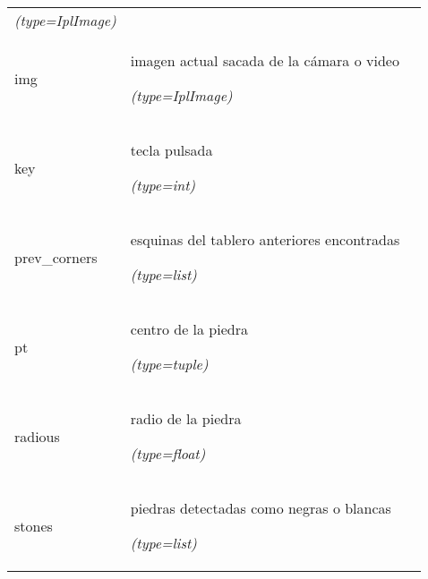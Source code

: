 \begin{longtable}{|p{\varnamewidth}|p{\vardescrwidth}|l}
            {\it (type=IplImage)}&\\
\cline{1-2}
\raggedright i\-m\-g\- & \raggedright imagen actual sacada de la cámara o video

            {\it (type=IplImage)}&\\
\cline{1-2}
\raggedright k\-e\-y\- & \raggedright tecla pulsada

            {\it (type=int)}&\\
\cline{1-2}
\raggedright p\-r\-e\-v\-\_\-c\-o\-r\-n\-e\-r\-s\- & \raggedright esquinas del tablero anteriores encontradas

            {\it (type=list)}&\\
\cline{1-2}
\raggedright p\-t\- & \raggedright centro de la piedra

            {\it (type=tuple)}&\\
\cline{1-2}
\raggedright r\-a\-d\-i\-o\-u\-s\- & \raggedright radio de la piedra

            {\it (type=float)}&\\
\cline{1-2}
\raggedright s\-t\-o\-n\-e\-s\- & \raggedright piedras detectadas como negras o blancas

            {\it (type=list)}&\\
\cline{1-2}
\end{longtable}

